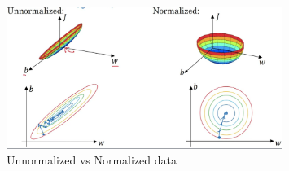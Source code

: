 \begin{figure}[h]
\centering
\includegraphics[width=0.8\textwidth]{normalizedVsUnnormalized.png}
\caption{\label{fig:NormVSnotNorm} Unnormalized vs Normalized data \cite{normalizing}}
\end{figure}


